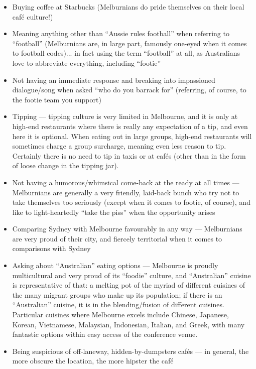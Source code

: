 \begin{itemize}
\item Buying coffee at Starbucks (Melburnians do pride themselves on
  their local caf\'e culture!)
\item Meaning anything other than ``Aussie rules football'' when
  referring to ``football'' (Melburnians are, in large part, famously
  one-eyed when it comes to football codes)... in fact using the term
  ``football'' at all, as Australians love to abbreviate everything,
  including ``footie''
\item Not having an immediate response and breaking into impassioned
  dialogue/song when asked ``who do you barrack for'' (referring, of
  course, to the footie team you support)
\item Tipping --- tipping culture is very limited in Melbourne, and it
  is only at high-end restaurants where there is really any expectation
  of a tip, and even here it is optional. When eating out in large
  groups, high-end restaurants will sometimes charge a group surcharge,
  meaning even less reason to tip. Certainly there is no need to tip in
  taxis or at caf\'es (other than in the form of loose change in the
  tipping jar).
\item Not having a humorous/whimsical come-back at the ready at all
  times --- Melburnians are generally a very friendly, laid-back bunch
  who try not to take themselves too seriously (except when it comes to
  footie, of course), and like to light-heartedly ``take the piss'' when
  the opportunity arises
\item Comparing Sydney with Melbourne favourably in any way ---
  Melburnians are very proud of their city, and fiercely territorial
  when it comes to comparisons with Sydney
\item Asking about ``Australian'' eating options --- Melbourne is
  proudly multicultural and very proud of its ``foodie'' culture, and
  ``Australian'' cuisine is representative of that: a melting pot of the
  myriad of different cuisines of the many migrant groups who make up
  its population; if there is an ``Australian'' cuisine, it is in the
  blending/fusion of different cuisines. Particular cuisines where
  Melbourne excels include Chinese, Japanese, Korean, Vietnamese,
  Malaysian, Indonesian, Italian, and Greek, with many fantastic options
  within easy access of the conference venue.
\item Being suspicious of off-laneway, hidden-by-dumpsters caf\'es ---
  in general, the more obscure the location, the more hipster the caf\'e

\end{itemize}
